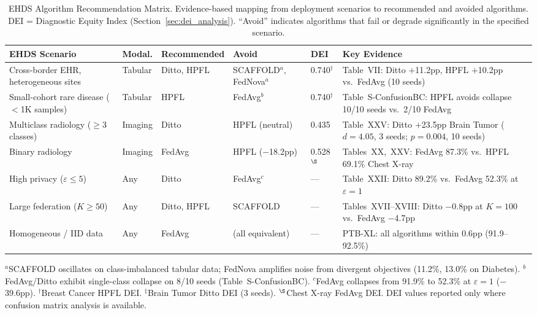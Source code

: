 \documentclass[conference]{IEEEtran}
\begin{document}
\begin{table}[htbp]
\centering
\caption{EHDS Algorithm Recommendation Matrix. Evidence-based mapping from deployment scenarios to recommended and avoided algorithms. DEI = Diagnostic Equity Index (Section~\ref{sec:dei_analysis}). ``Avoid'' indicates algorithms that fail or degrade significantly in the specified scenario.}
\label{tab:algo_recommendation}
\small
\begin{tabular}{p{3.2cm}p{1.2cm}p{2.0cm}p{2.5cm}p{0.8cm}p{4.8cm}}
\toprule
\textbf{EHDS Scenario} & \textbf{Modal.} & \textbf{Recommended} & \textbf{Avoid} & \textbf{DEI} & \textbf{Key Evidence} \\
\midrule
Cross-border EHR, heterogeneous sites & Tabular & Ditto, HPFL & SCAFFOLD$^a$, FedNova$^a$ & 0.740$^\dagger$ & Table~VII: Ditto $+$11.2pp, HPFL $+$10.2pp vs.\ FedAvg (10 seeds) \\
\addlinespace
Small-cohort rare disease ($<$1K samples) & Tabular & HPFL & FedAvg$^b$ & 0.740$^\dagger$ & Table~S-ConfusionBC: HPFL avoids collapse 10/10 seeds vs.\ 2/10 FedAvg \\
\addlinespace
Multiclass radiology ($\geq$3 classes) & Imaging & Ditto & HPFL (neutral) & 0.435 & Table~XXV: Ditto $+$23.5pp Brain Tumor ($d{=}4.05$, 3 seeds; $p{=}0.004$, 10 seeds) \\
\addlinespace
Binary radiology & Imaging & FedAvg & HPFL ($-$18.2pp) & 0.528$^\S$ & Tables~XX,~XXV: FedAvg 87.3\% vs.\ HPFL 69.1\% Chest X-ray \\
\addlinespace
High privacy ($\varepsilon \leq 5$) & Any & Ditto & FedAvg$^c$ & --- & Table~XXII: Ditto 89.2\% vs.\ FedAvg 52.3\% at $\varepsilon{=}1$ \\
\addlinespace
Large federation ($K \geq 50$) & Any & Ditto, HPFL & SCAFFOLD & --- & Tables~XVII--XVIII: Ditto $-$0.8pp at $K{=}100$ vs.\ FedAvg $-$4.7pp \\
\addlinespace
Homogeneous / IID data & Any & FedAvg & (all equivalent) & --- & PTB-XL: all algorithms within 0.6pp (91.9--92.5\%) \\
\bottomrule
\end{tabular}

\vspace{1mm}
\footnotesize{$^a$SCAFFOLD oscillates on class-imbalanced tabular data; FedNova amplifies noise from divergent objectives (11.2\%, 13.0\% on Diabetes). $^b$FedAvg/Ditto exhibit single-class collapse on 8/10 seeds (Table~S-ConfusionBC). $^c$FedAvg collapses from 91.9\% to 52.3\% at $\varepsilon{=}1$ ($-$39.6pp). $^\dagger$Breast Cancer HPFL DEI. $^\ddagger$Brain Tumor Ditto DEI (3 seeds). $^\S$Chest X-ray FedAvg DEI. DEI values reported only where confusion matrix analysis is available.}
\end{table}
\end{document}
